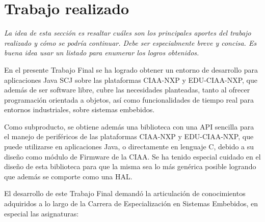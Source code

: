 
\section{Trabajo realizado}

\emph{La idea de esta sección es resaltar cuáles son los principales aportes del trabajo realizado y cómo se podría continuar. Debe ser especialmente breve y concisa. Es buena idea usar un listado para enumerar los logros obtenidos.}



En el presente Trabajo Final se ha logrado obtener un entorno de desarrollo para aplicaciones Java SCJ sobre las plataformas CIAA-NXP y EDU-CIAA-NXP, que además de ser software libre, cubre las necesidades planteadas, tanto al ofrecer programación orientada a objetos, así como funcionalidades de tiempo real para entornos industriales, sobre sistemas embebidos.

\medskip

Como subproducto, se obtiene además una biblioteca con una API sencilla para el manejo de periféricos de las plataformas CIAA-NXP y EDU-CIAA-NXP, que puede utilizarse en aplicaciones Java, o directamente en lenguaje C, debido a su diseño como módulo de Firmware de la CIAA. Se ha tenido especial cuidado en el diseño de esta biblioteca para que la misma sea lo más genérica posible logrando que además se comporte como una HAL.



\medskip

El desarrollo de este Trabajo Final demandó la articulación de conocimientos  adquiridos a lo largo de la Carrera de Especialización en Sistemas Embebidos, en especial las asignaturas:


